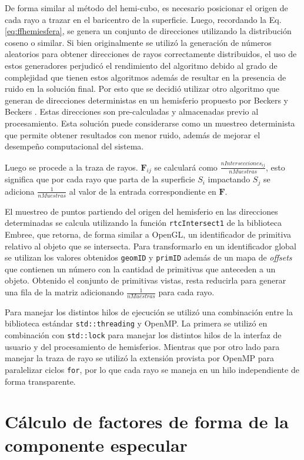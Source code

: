 De forma similar al método del hemi-cubo, es necesario posicionar el origen de cada rayo a trazar en el baricentro de la superficie. Luego, recordando la Eq. \eqref{eq:ffhemiesfera}, se genera un conjunto de direcciones utilizando la distribución coseno o similar. Si bien originalmente se utilizó la generación de números aleatorios para obtener direcciones de rayos correctamente distribuidos, el uso de estos generadores perjudicó el rendimiento del algoritmo debido al grado de complejidad que tienen estos algoritmos además de resultar en la presencia de ruido en la solución final. Por esto que se decidió utilizar otro algoritmo que generan de direcciones deterministas en un hemisferio propuesto por Beckers y Beckers \cite{Beckers}. Estas direcciones son pre-calculadas y almacenadas previo al procesamiento. Esta solución puede considerarse como un muestreo determinista que permite obtener resultados con menor ruido, además de mejorar el desempeño computacional del sistema.

Luego se procede a la traza de rayos. $\mathbf{F}_{ij}$ se calculará como $\frac{nIntersecciones_{ij}}{nMuestras}$, esto significa que por cada rayo que parta de la superficie $S_{i}$ impactando $S_{j}$ se adiciona $\frac{1}{nMuestras}$ al valor de la entrada correspondiente en $\mathbf{F}$.

El muestreo de puntos partiendo del origen del hemisferio en las direcciones determinadas se calcula utilizando la función \verb|rtcIntersect1| de la biblioteca Embree, que retorna, de forma similar a OpenGL, un identificador de primitiva relativo al objeto que se intersecta. Para transformarlo en un identificador global se utilizan los valores obtenidos \verb|geomID| y \verb|primID| además de un mapa de \textit{offsets} que contienen un número con la cantidad de primitivas que anteceden a un objeto. Obtenido el conjunto de primitivas vistas, resta reducirla para generar una fila de la matriz adicionando $\frac{1}{nMuestras}$ para cada rayo.

Para manejar los distintos hilos de ejecución se utilizó una combinación entre la biblioteca estándar \verb|std::threading| y OpenMP. La primera se utilizó en combinación con \verb|std::lock| para manejar los distintos hilos de la interfaz de usuario y del procesamiento de hemisferios. Mientras que por otro lado para manejar la traza de rayo se utilizó la extensión provista por OpenMP para paralelizar ciclos \verb|for|, por lo que cada rayo se maneja en un hilo independiente de forma transparente.

\section{Cálculo de factores de forma de la componente especular}

